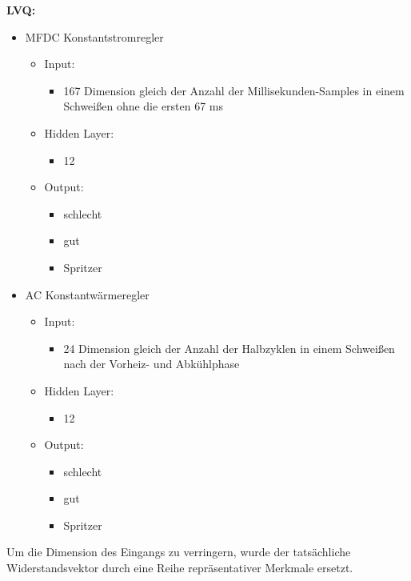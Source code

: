 \documentclass[english,ngerman]{tudscrreprt}
\begin{document}
\textbf{LVQ: }
\begin{itemize}
\item MFDC Konstantstromregler
\begin{itemize}
\item Input:
\begin{itemize}
	\item 167 Dimension gleich der Anzahl der Millisekunden-Samples in einem Schweißen ohne die ersten 67 ms
\end{itemize}
\item Hidden Layer:
\begin{itemize}
	\item 12
\end{itemize}
\item Output:
\begin{itemize}
	\item schlecht 
	\item gut 
	\item Spritzer
\end{itemize}
\end{itemize}
\item AC  Konstantwärmeregler
\begin{itemize}
\item Input:
\begin{itemize}
	\item 24 Dimension gleich der Anzahl der Halbzyklen in einem Schweißen nach der Vorheiz- und Abkühlphase
\end{itemize}
\item Hidden Layer:
\begin{itemize}
	\item 12
\end{itemize}
\item Output:
\begin{itemize}
	\item schlecht 
	\item gut 
	\item Spritzer
\end{itemize}
\end{itemize}
\end{itemize}

Um die Dimension des Eingangs zu verringern, wurde der tatsächliche Widerstandsvektor durch eine Reihe repräsentativer Merkmale ersetzt.
\end{document}
